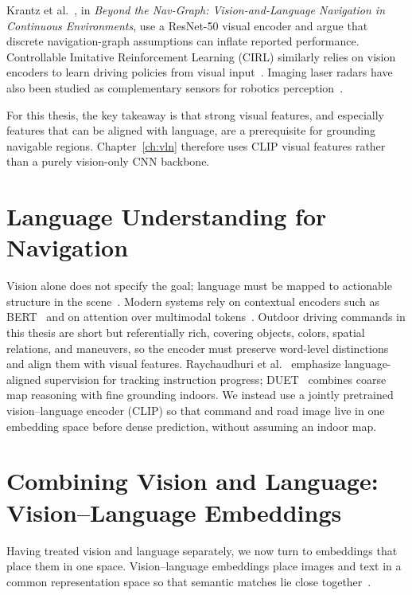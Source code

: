 Krantz et al.~\cite{krantz2020beyond}, in \textit{Beyond the Nav-Graph: Vision-and-Language Navigation in Continuous Environments}, use a ResNet-50 visual encoder and argue that discrete navigation-graph assumptions can inflate reported performance. Controllable Imitative Reinforcement Learning (CIRL) similarly relies on vision encoders to learn driving policies from visual input~\cite{Liang2018CIRL}. Imaging laser radars have also been studied as complementary sensors for robotics perception~\cite{Hebert3}.

For this thesis, the key takeaway is that strong visual features, and especially features that can be aligned with language, are a prerequisite for grounding navigable regions. Chapter~\ref{ch:vln} therefore uses CLIP visual features rather than a purely vision-only CNN backbone.

\section{Language Understanding for Navigation}

Vision alone does not specify the goal; language must be mapped to actionable structure in the scene~\cite{Chen2011Learning,anderson2018vision}. Modern systems rely on contextual encoders such as BERT~\cite{devlin2018bert} and on attention over multimodal tokens~\cite{vaswani2017attention,hong2021vln}. Outdoor driving commands in this thesis are short but referentially rich, covering objects, colors, spatial relations, and maneuvers, so the encoder must preserve word-level distinctions and align them with visual features. Raychaudhuri et al.~\cite{Raychaudhuri2021Language} emphasize language-aligned supervision for tracking instruction progress; DUET~\cite{chen2022think} combines coarse map reasoning with fine grounding indoors. We instead use a jointly pretrained vision--language encoder (CLIP) so that command and road image live in one embedding space before dense prediction, without assuming an indoor map.

\section{Combining Vision and Language: Vision--Language Embeddings}

Having treated vision and language separately, we now turn to embeddings that place them in one space. Vision--language embeddings place images and text in a common representation space so that semantic matches lie close together~\cite{Baltrusaitis2019Multimodal,Lu2019VILBERT}.

